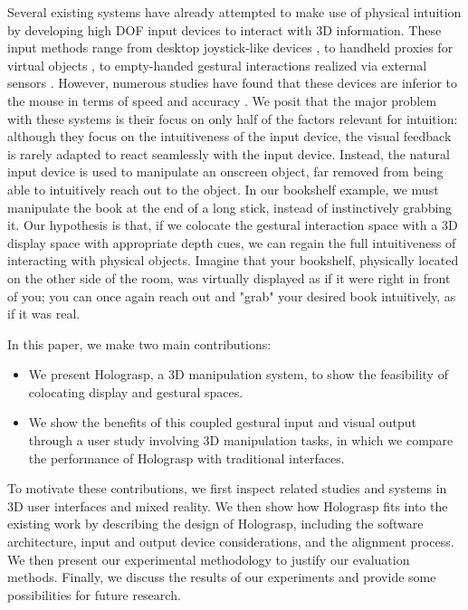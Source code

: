 \documentclass[pageno]{jpaper}
\begin{document}
Several existing systems have already attempted to make use of physical intuition by developing high DOF input 
devices to interact with 3D information. These input methods range from desktop joystick-like
devices \cite{mattheiss2011navigating}, to handheld proxies for virtual objects \cite{mine1997moving}, to empty-handed gestural interactions realized via 
external sensors \cite{manders2010gesture}.
However, numerous studies have found that these devices are inferior to the mouse in terms of speed and accuracy \cite{mattheiss2011navigating, study1}.
We posit that the major problem with these systems is their focus on only half of the factors relevant for intuition: although they focus on the intuitiveness of 
the input device, the visual feedback is rarely adapted to react seamlessly with the input device. Instead, the natural input device is used to manipulate an onscreen object, far
removed from being able to intuitively reach out to the object. In our bookshelf example, we must manipulate the book at the end of a long stick, instead of
instinctively grabbing it. Our hypothesis is that, if we colocate the gestural interaction space with a 3D display space with appropriate depth cues, we can regain
the full intuitiveness of interacting with physical objects. Imagine that your bookshelf, physically located on the other side of the room, was virtually displayed as if it were right
in front of you; you can once again reach out and "grab" your desired book intuitively, as if it was real.

In this paper, we make two main contributions:
\begin{itemize}
\item We present Holograsp, a 3D manipulation system, to show the feasibility of colocating display and gestural spaces.
\item We show the benefits of this coupled gestural input and visual output through a user study involving 3D manipulation tasks, in which we compare the
performance of Holograsp with traditional interfaces.
\end{itemize}

To motivate these contributions, we first inspect related studies and systems in 3D user interfaces and mixed reality. We then show how Holograsp fits
into the existing work by describing the design of Holograsp, including the software architecture, input and output device considerations,
and the alignment process. We then present our experimental methodology to justify our evaluation methods. Finally, we discuss the results
of our experiments and provide some possibilities for future research. 
\end{document}
